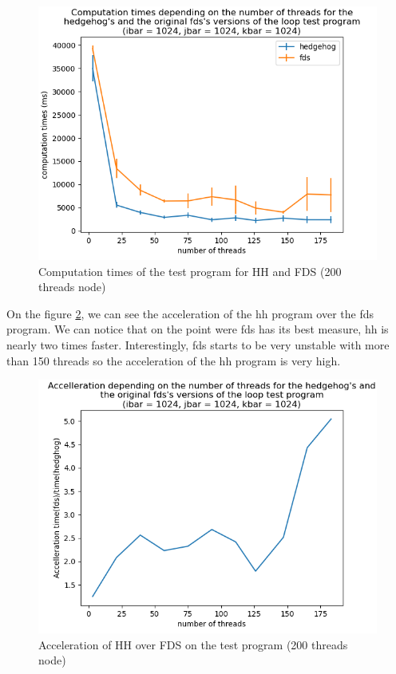 \begin{figure}[ht!]
  \begin{center}
    \includegraphics[scale=0.6]{img/fds-loops/times.png}
    \caption{Computation times of the test program for HH and FDS (200 threads node)}
    \label{fig:loopscomptime}
  \end{center}
\end{figure}

On the figure \ref{fig:loopsspeedup}, we can see the acceleration of the
\gls{hh} program over the \gls{fds} program. We can notice that on the point
were \gls{fds} has its best measure, \gls{hh} is nearly two times faster.
Interestingly, \gls{fds} starts to be very unstable with more than 150 threads
so the acceleration of the \gls{hh} program is very high.

\begin{figure}[ht!]
  \begin{center}
    \includegraphics[scale=0.6]{img/fds-loops/speedup.png}
    \caption{Acceleration of HH over FDS on the test program (200 threads node)}
    \label{fig:loopsspeedup}
  \end{center}
\end{figure}

